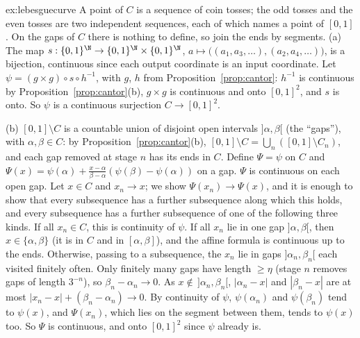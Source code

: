 \begin{solution}{ex:lebesguecurve}
\idea A point of $C$ is a sequence of coin tosses; the odd tosses and the even tosses are two independent sequences, each of which names a point of
$[0,1]$. On the gaps of $C$ there is nothing to define, so join the ends by segments.
\writeup (a) The map $s:\{0,1\}^\N\to\{0,1\}^\N\times\{0,1\}^\N$, $a\mapsto\bigl((a_1,a_3,\ldots),(a_2,a_4,\ldots)\bigr)$, is a bijection, continuous since each output coordinate is an input coordinate.
Let $\psi=(g\times g)\circ s\circ h^{-1}$, with $g$, $h$ from Proposition~\ref{prop:cantor}: $h^{-1}$ is continuous by Proposition~\ref{prop:cantor}(b), $g\times g$ is continuous and onto
$[0,1]^2$, and $s$ is onto. So $\psi$ is a continuous surjection $C\to[0,1]^2$.

(b) $[0,1]\setminus C$ is a countable union of disjoint open intervals $]\alpha,\beta[$ (the ``gaps''), with $\alpha,\beta\in C$: by Proposition~\ref{prop:cantor}(b), $[0,1]\setminus C=\bigcup_n([0,1]\setminus C_n)$,
and each gap removed at stage $n$ has its ends in $C$. Define $\Psi=\psi$ on $C$ and $\Psi(x)=\psi(\alpha)+\frac{x-\alpha}{\beta-\alpha}(\psi(\beta)-\psi(\alpha))$ on a gap. $\Psi$ is continuous on each open gap.
Let $x\in C$ and $x_n\to x$; we show $\Psi(x_n)\to\Psi(x)$, and it is enough to show that every subsequence has a further subsequence along which this holds, and every subsequence has a further
subsequence of one of the following three kinds. If all $x_n\in C$, this is continuity of $\psi$.
If all $x_n$ lie in one gap $]\alpha,\beta[$, then $x\in\{\alpha,\beta\}$ (it is in $C$ and in $[\alpha,\beta]$), and the affine formula is continuous up to the ends. Otherwise, passing to
a subsequence, the $x_n$ lie in gaps $]\alpha_n,\beta_n[$ each visited finitely often. Only finitely many gaps have length $\ge\eta$ (stage $n$ removes gaps of length
$3^{-n}$), so $\beta_n-\alpha_n\to0$. As $x\notin\,]\alpha_n,\beta_n[$, $|\alpha_n-x|$ and $|\beta_n-x|$ are at most $|x_n-x|+(\beta_n-\alpha_n)\to0$. By continuity of $\psi$, $\psi(\alpha_n)$ and $\psi(\beta_n)$
tend to $\psi(x)$, and $\Psi(x_n)$, which lies on the segment between them, tends to $\psi(x)$ too. So $\Psi$ is continuous, and onto $[0,1]^2$ since $\psi$ already is.
\end{solution}

